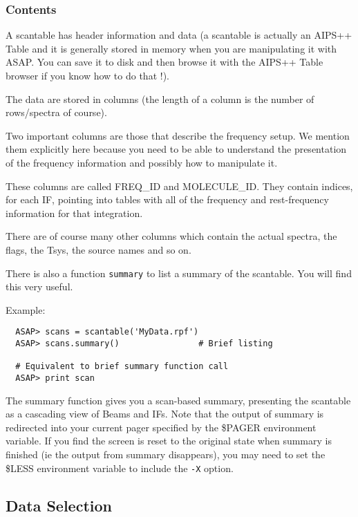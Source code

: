 \documentclass[11pt]{article}
\newcommand{\cmd}[1]{{\tt #1}}
\begin{document}
\subsubsection {Contents}

A scantable has header information and data
(a scantable is actually an AIPS++ Table and it is generally stored in
memory when you are manipulating it with ASAP.  You can save it to
disk and then browse it with the AIPS++ Table browser if you know how
to do that !).

The data are stored in columns (the length of a column is the number of
rows/spectra of course).

Two important columns are those that describe the frequency setup.  We mention
them explicitly here because you need to be able to understand the presentation
of the frequency information and possibly how to manipulate it.

These columns are called FREQ\_ID and MOLECULE\_ID.  They contain indices, for
each IF, pointing into tables with all of the frequency and rest-frequency
information for that integration. 

There are of course many other columns which contain the actual spectra,
the flags, the Tsys, the source names and so on.

There is also a function \cmd{summary} to list a summary of the scantable.
You will find this very useful.

Example:

\begin{verbatim}
  ASAP> scans = scantable('MyData.rpf')
  ASAP> scans.summary()                # Brief listing

  # Equivalent to brief summary function call
  ASAP> print scan
\end{verbatim}

The summary function gives you a scan-based summary, presenting the
scantable as a cascading view of Beams and IFs. Note that the output
of summary is redirected into your current pager specified by the
\$PAGER environment variable. If you find the screen is reset to the
original state when summary is finished (ie the output from summary
disappears), you may need to set the \$LESS environment variable to
include the \cmd{-X} option.

\subsection{Data Selection}
\label{sec:selection}
\end{document}

